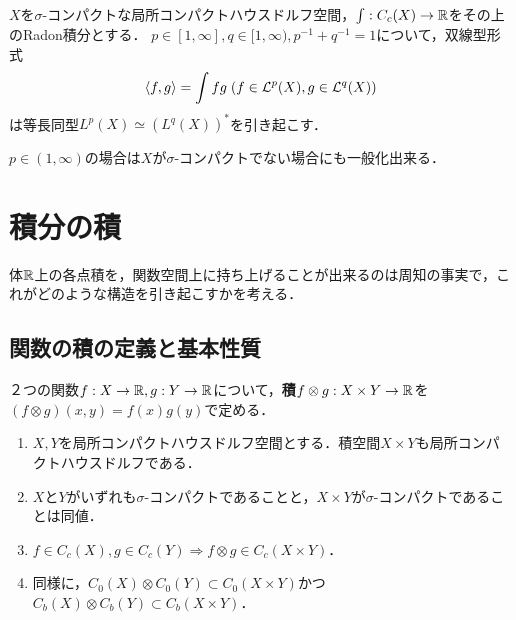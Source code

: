 \documentclass[uplatex,dvipdfmx]{jsreport}
\begin{document}
\begin{theorem}[双対]\label{thm-duality-of-Lp}
    $X$を$\sigma$-コンパクトな局所コンパクトハウスドルフ空間，$\int:C_c(X)\to\mathbb{R}$をその上のRadon積分とする．
    $p\in[1,\infty],q\in[1,\infty),p^{-1}+q^{-1}=1$について，双線型形式
    \[\langle f,g\rangle=\int fg\;(f\in\mathcal{L}^p(X),g\in\mathcal{L}^q(X))\]
    は等長同型$L^p(X)\simeq (L^q(X))^*$を引き起こす．
\end{theorem}
\begin{remark}
    $p\in(1,\infty)$の場合は$X$が$\sigma$-コンパクトでない場合にも一般化出来る．
\end{remark}

\section{積分の積}

\begin{tcolorbox}[colframe=ForestGreen, colback=ForestGreen!10!white,breakable,colbacktitle=ForestGreen!40!white,coltitle=black,fonttitle=\bfseries\sffamily,
title=]
    体$\mathbb{R}$上の各点積を，関数空間上に持ち上げることが出来るのは周知の事実で，これがどのような構造を引き起こすかを考える．
\end{tcolorbox}

\subsection{関数の積の定義と基本性質}

\begin{definition}[product]
    ２つの関数$f:X\to\mathbb{R},g:Y\to\mathbb{R}$について，\textbf{積}$f\otimes g:X\times Y\to\mathbb{R}$を$(f\otimes g)(x,y)=f(x)g(y)$で定める．
\end{definition}

\begin{lemma}\mbox{}
    \begin{enumerate}
        \item $X,Y$を局所コンパクトハウスドルフ空間とする．積空間$X\times Y$も局所コンパクトハウスドルフである．
        \item $X$と$Y$がいずれも$\sigma$-コンパクトであることと，$X\times Y$が$\sigma$-コンパクトであることは同値．
        \item $f\in C_c(X),g\in C_c(Y)\Rightarrow f\otimes g\in C_c(X\times Y)$．
        \item 同様に，$C_0(X)\otimes C_0(Y)\subset C_0(X\times Y)$かつ$C_b(X)\otimes C_b(Y)\subset C_b(X\times Y)$．
    \end{enumerate}
\end{lemma}
\end{document}
